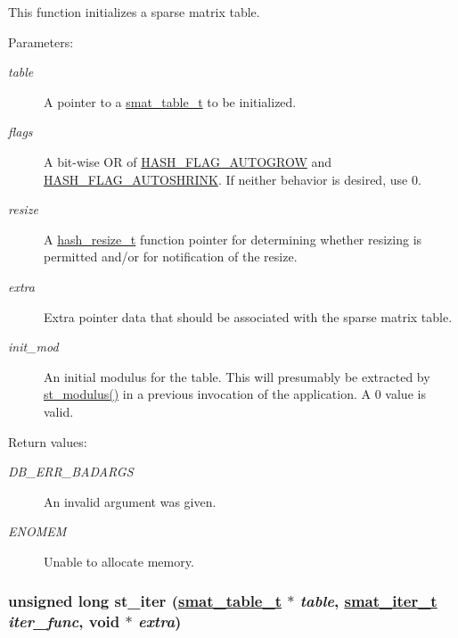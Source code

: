 This function initializes a sparse matrix table.\begin{Desc}
\item[Parameters: ]\par
\begin{description}
\item[{\em 
table}]A pointer to a \hyperlink{group__dbprim__smat_a0}{smat\_\-table\_\-t} to be initialized. \item[{\em 
flags}]A bit-wise OR of \hyperlink{group__dbprim__hash_a16}{HASH\_\-FLAG\_\-AUTOGROW} and \hyperlink{group__dbprim__hash_a17}{HASH\_\-FLAG\_\-AUTOSHRINK}. If neither behavior is desired, use 0. \item[{\em 
resize}]A \hyperlink{group__dbprim__hash_a5}{hash\_\-resize\_\-t} function pointer for determining whether resizing is permitted and/or for notification of the resize. \item[{\em 
extra}]Extra pointer data that should be associated with the sparse matrix table. \item[{\em 
init\_\-mod}]An initial modulus for the table. This will presumably be extracted by \hyperlink{group__dbprim__smat_a24}{st\_\-modulus()} in a previous invocation of the application. A 0 value is valid.\end{description}
\end{Desc}
\begin{Desc}
\item[Return values: ]\par
\begin{description}
\item[{\em 
DB\_\-ERR\_\-BADARGS}]An invalid argument was given. \item[{\em 
ENOMEM}]Unable to allocate memory. \end{description}
\end{Desc}
\hypertarget{group__dbprim__smat_a13}{
\subsubsection[st\_\-iter]{\setlength{\rightskip}{0pt plus 5cm}unsigned long st\_\-iter (\hyperlink{group__dbprim__smat_a0}{smat\_\-table\_\-t} $\ast$ {\em table}, \hyperlink{group__dbprim__smat_a4}{smat\_\-iter\_\-t} {\em iter\_\-func}, void $\ast$ {\em extra})}}
\label{group__dbprim__smat_a13}


